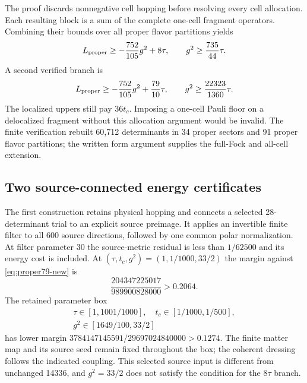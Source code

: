 The proof discards nonnegative cell hopping before resolving every cell
allocation. Each resulting block is a sum of the complete one-cell fragment
operators. Combining their bounds over all proper flavor partitions yields
\begin{equation}
L_{\rm proper}\geq-\frac{752}{105}g^2+8\tau,
\qquad g^2\geq\frac{735}{44}\tau.
\label{eq:proper-lower-new}
\end{equation}
A second verified branch is
\begin{equation}
L_{\rm proper}\geq-\frac{752}{105}g^2+\frac{79}{10}\tau,
\qquad g^2\geq\frac{22323}{1360}\tau.
\label{eq:proper79-new}
\end{equation}
The localized uppers still pay $36t_c$. Imposing a one-cell Pauli floor on
a delocalized fragment without this allocation argument would be invalid.
The finite verification rebuilt 60,712 determinants in 34 proper sectors
and 91 proper flavor partitions; the written form argument supplies the
full-Fock and all-cell extension.

\subsection{Two source-connected energy certificates}
\label{sec:li6-certificates-new}

The first construction retains physical hopping and connects a selected
28-determinant trial to an explicit source preimage. It applies an invertible
finite filter to all 600 source directions, followed by one common polar
normalization. At filter parameter 30 the source-metric residual is less
than $1/62500$ and its energy cost is included. At
$(\tau,t_c,g^2)=(1,1/1000,33/2)$ the margin against
\eqref{eq:proper79-new} is
\begin{equation}
\frac{204347225017}{989900828000}>0.2064.
\end{equation}
The retained parameter box
\begin{equation}
\begin{gathered}
\tau\in[1,1001/1000],\quad t_c\in[1/1000,1/500],\\
g^2\in[1649/100,33/2]
\end{gathered}
\end{equation}
has lower margin $3784147145591/29697024840000>0.1274$.
The finite matter map and its source seed remain fixed throughout the box;
the coherent dressing follows the indicated coupling. This selected source input is different from
unchanged 14336, and $g^2=33/2$ does not satisfy the condition for the
$8\tau$ branch.

